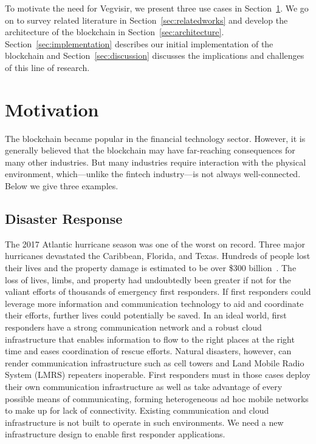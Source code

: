\documentclass[conference, letterpaper]{IEEEtran}
\begin{document}

To motivate the need for Vegvisir, we present three use cases in Section~\ref{sec:motive}. We go on to survey related literature in Section~\ref{sec:relatedworks} and develop the architecture of the blockchain in Section~\ref{sec:architecture}. Section~\ref{sec:implementation} describes our initial implementation of the blockchain and Section~\ref{sec:discussion} discusses the implications and challenges of this line of research.

\section{Motivation}\label{sec:motive}

The blockchain became popular in the financial technology sector.  However, it is generally believed that the blockchain may have far-reaching consequences for many other industries.  But many industries require interaction with the physical environment, which---unlike the fintech industry---is not always well-connected.  Below we give three examples.

\subsection{Disaster Response}
\label{sec:use-based}

The 2017 Atlantic hurricane season was one of the worst on record. Three major hurricanes devastated the Caribbean, Florida, and Texas. Hundreds of people lost their lives and the property damage is estimated to be over \$300 billion~\cite{cnn_hurricane_2017}. The loss of lives, limbs, and property had undoubtedly been greater if not for the valiant efforts of thousands of emergency first responders. If first responders could leverage more information and communication technology to aid and coordinate their efforts, further lives could potentially be saved. In an ideal world, first responders have a strong communication network and a robust cloud infrastructure that enables information to flow to the right places at the right time and eases coordination of rescue efforts. Natural disasters, however, can render communication infrastructure such as cell towers and Land Mobile Radio System (LMRS) repeaters inoperable. First responders must in those cases deploy their own communication infrastructure as well as take advantage of every possible means of communicating, forming heterogeneous ad hoc mobile networks to make up for lack of connectivity. Existing communication and cloud infrastructure is not built to operate in such environments. We need a new infrastructure design to enable first responder applications.
\end{document}
